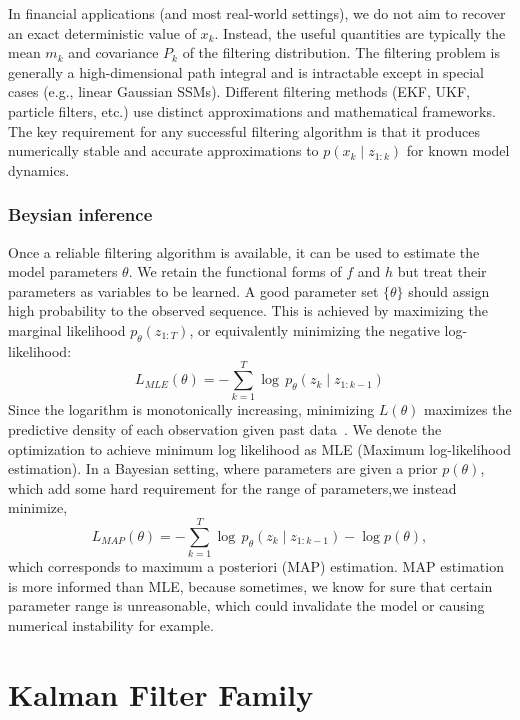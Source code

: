 \documentclass{article}
\begin{document}
In financial applications (and most real-world settings), we do not aim to recover an exact deterministic value of $x_k$. Instead, the useful quantities are typically the mean $m_k$ and covariance $P_k$ of the filtering distribution. The filtering problem is generally a high-dimensional path integral and is intractable except in special cases (e.g., linear Gaussian SSMs). Different filtering methods (EKF, UKF, particle filters, etc.) use distinct approximations and mathematical frameworks. The key requirement for any successful filtering algorithm is that it produces numerically stable and accurate approximations to $p(x_k \mid z_{1:k})$ for known model dynamics.

\subsubsection{Beysian inference}

Once a reliable filtering algorithm is available, it can be used to estimate the model parameters $\theta$. We retain the functional forms of $f$ and $h$ but treat their parameters as variables to be learned. A good parameter set $\{\theta\}$ should assign high probability to the observed sequence. This is achieved by maximizing the marginal likelihood $p_\theta(z_{1:T})$, or equivalently minimizing the negative log-likelihood:
\begin{equation}
    L_{MLE}(\theta) = -\sum_{k=1}^{T} \log \, p_\theta(z_k \mid z_{1:k-1})
\end{equation}
Since the logarithm is monotonically increasing, minimizing $L(\theta)$ maximizes the predictive density of each observation given past data~\cite{Särkkä2013BayesianFilteringAndSmoothing}. We denote the optimization to achieve minimum log likelihood as MLE (Maximum log-likelihood estimation). In a Bayesian setting, where parameters are given a prior $p(\theta)$, which add some hard requirement for the range of parameters,we instead minimize,
\begin{equation}
    L_{MAP}(\theta) = -\sum_{k=1}^{T} \log \, p_\theta(z_k \mid z_{1:k-1}) - \log p(\theta),
\end{equation}
which corresponds to maximum a posteriori (MAP) estimation. MAP estimation is more informed than MLE, because sometimes, we know for sure that certain parameter range is unreasonable, which could invalidate the model or causing numerical instability for example.


\newpage
\section{Kalman Filter Family}
\end{document}
